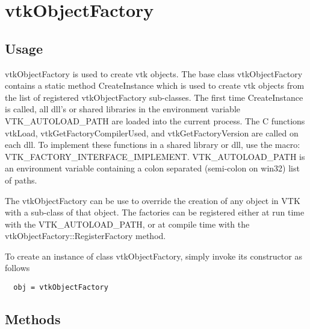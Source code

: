 \section{vtkObjectFactory}

\subsection{Usage}

 vtkObjectFactory is used to create vtk objects.   The base class
 vtkObjectFactory contains a static method CreateInstance which is used
 to create vtk objects from the list of registered vtkObjectFactory 
 sub-classes.   The first time CreateInstance is called, all dll's or shared
 libraries in the environment variable VTK\_AUTOLOAD\_PATH are loaded into
 the current process.   The C functions vtkLoad, vtkGetFactoryCompilerUsed, 
 and vtkGetFactoryVersion are called on each dll.  To implement these
 functions in a shared library or dll, use the macro:
 VTK\_FACTORY\_INTERFACE\_IMPLEMENT.
 VTK\_AUTOLOAD\_PATH is an environment variable 
 containing a colon separated (semi-colon on win32) list of paths.

 The vtkObjectFactory can be use to override the creation of any object
 in VTK with a sub-class of that object.  The factories can be registered
 either at run time with the VTK\_AUTOLOAD\_PATH, or at compile time
 with the vtkObjectFactory::RegisterFactory method.


To create an instance of class vtkObjectFactory, simply
invoke its constructor as follows
\begin{verbatim}
  obj = vtkObjectFactory
\end{verbatim}
\subsection{Methods}

